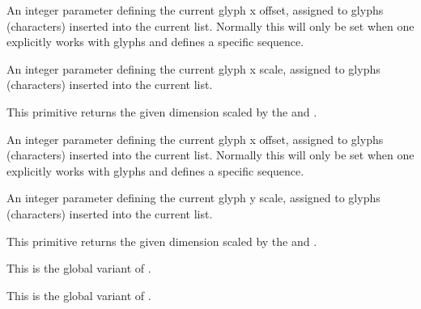 \stopnewprimitive

\startnewprimitive[title={\prm {glyphxoffset}}]

An integer parameter defining the current glyph x offset, assigned to glyphs
(characters) inserted into the current list. Normally this will only be set when
one explicitly works with glyphs and defines a specific sequence.

\stopnewprimitive

\startnewprimitive[title={\prm {glyphxscale}}]

An integer parameter defining the current glyph x scale, assigned to glyphs
(characters) inserted into the current list.

\stopnewprimitive

\startnewprimitive[title={\prm {glyphxscaled}}]

This primitive returns the given dimension scaled by the  and
.

\stopnewprimitive

\startnewprimitive[title={\prm {glyphyoffset}}]

An integer parameter defining the current glyph x offset, assigned to glyphs
(characters) inserted into the current list. Normally this will only be set when
one explicitly works with glyphs and defines a specific sequence.

\stopnewprimitive

\startnewprimitive[title={\prm {glyphyscale}}]

An integer parameter defining the current glyph y scale, assigned to glyphs
(characters) inserted into the current list.

\stopnewprimitive

\startnewprimitive[title={\prm {glyphyscaled}}]

This primitive returns the given dimension scaled by the  and
.

\stopnewprimitive

\startnewprimitive[title={\prm {gtoksapp}}]

This is the global variant of .

\stopnewprimitive

\startnewprimitive[title={\prm {gtokspre}}]

This is the global variant of .

\stopnewprimitive

\startoldprimitive[title={\prm {halign}}]


